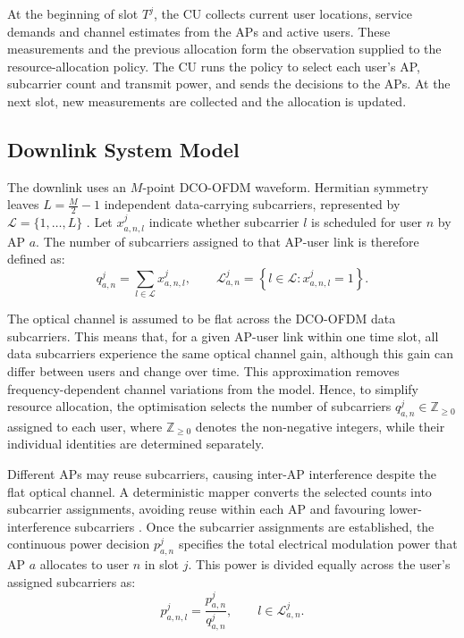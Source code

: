 \documentclass[journal]{IEEEtran}
\begin{document}
At the beginning of slot $T^{j}$, the CU collects current user locations, service demands and channel estimates from the APs and active users. These measurements and the previous allocation form the observation supplied to the resource-allocation policy. The CU runs the policy to select each user's AP, subcarrier count and transmit power, and sends the decisions to the APs. At the next slot, new measurements are collected and the allocation is updated.

\subsection{Downlink System Model}

The downlink uses an $M$-point DCO-OFDM waveform. Hermitian symmetry leaves $L=\frac{M}{2}-1$ independent data-carrying subcarriers, represented by $\mathcal{L}=\{1,\ldots,L\}$ \cite{Tsonev2015,Sarbazi2024Receiver}. Let $x_{a,n,l}^{j}$ indicate whether subcarrier $l$ is scheduled for user $n$ by AP $a$. The number of subcarriers assigned to that AP-user link is therefore defined as:
\begin{equation}
    q_{a,n}^{j}=\sum_{l\in\mathcal{L}}x_{a,n,l}^{j},
    \qquad
    \mathcal{L}_{a,n}^{j}=\left\{l\in\mathcal{L}:x_{a,n,l}^{j}=1\right\}.
    \label{eq:subcarrier_count}
\end{equation}

The optical channel is assumed to be flat across the DCO-OFDM data
subcarriers. This means that, for a given AP-user link within one time
slot, all data subcarriers experience the same optical channel gain,
although this gain can differ between users and change over time.
This approximation removes frequency-dependent channel variations
from the model. Hence, to simplify resource allocation, the optimisation selects
the number of subcarriers $q_{a,n}^{j}\in\mathbb{Z}_{\geq 0}$
assigned to each user, where $\mathbb{Z}_{\geq 0}$ denotes the
non-negative integers, while their individual identities are
determined separately.

Different APs may reuse subcarriers, causing inter-AP interference despite the flat optical channel. A deterministic mapper converts the selected counts into subcarrier assignments, avoiding reuse within each AP and favouring lower-interference subcarriers \cite{6644236}. Once the subcarrier assignments are established, the continuous power decision $p_{a,n}^{j}$ specifies the total electrical modulation power
that AP $a$ allocates to user $n$ in slot $j$. This power is divided
equally across the user's assigned subcarriers as:
\begin{equation}
    p_{a,n,l}^{j}=\frac{p_{a,n}^{j}}{q_{a,n}^{j}},
    \qquad l\in\mathcal{L}_{a,n}^{j}.
    \label{eq:equal_power_split}
\end{equation}
\end{document}
